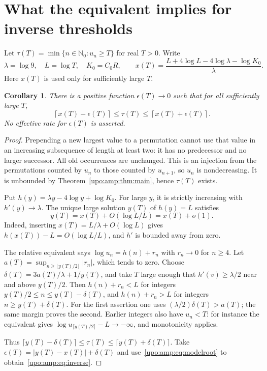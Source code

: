 \documentclass[11pt,letterpaper]{article}
\newtheorem{corollary}[theorem]{Corollary}
\theoremstyle{remark}\newtheorem{remark}[theorem]{Remark}
\numberwithin{equation}{section}
\newcommand{\N}{\mathbb N_0}
\begin{document}
\section{What the equivalent implies for inverse thresholds}\label{upo:amp:sec:inverse}
Let $\tau(T)=\min\{n\in\N:u_n\ge T\}$ for real $T>0$. Write
\[
\lambda=\log9,\quad L=\log T,\quad K_0=C_0R,
\qquad
x(T)=\frac{L+4\log L-4\log\lambda-\log K_0}{\lambda}.
\]
Here $x(T)$ is used only for sufficiently large $T$.

\begin{corollary}\label{upo:amp:cor:inverse}
There is a positive function $\epsilon(T)\to0$ such that for all
sufficiently large $T$,
\begin{equation}\label{upo:amp:eq:inverse}
\left\lceil x(T)-\epsilon(T)\right\rceil
\le\tau(T)\le
\left\lceil x(T)+\epsilon(T)\right\rceil.
\end{equation}
No effective rate for $\epsilon(T)$ is asserted.
\end{corollary}
\begin{proof}
Prepending a new largest value to a permutation cannot use that value in
an increasing subsequence of length at least two: it has no predecessor
and no larger successor. All old occurrences are unchanged. This is an
injection from the permutations counted by $u_n$ to those counted by
$u_{n+1}$, so $u_n$ is nondecreasing. It is unbounded by
Theorem~\ref{upo:amp:thm:main}, hence $\tau(T)$ exists.

Put $h(y)=\lambda y-4\log y+\log K_0$. For large $y$, it is strictly
increasing with $h'(y)\to\lambda$. The unique large solution $y(T)$ of
$h(y)=L$ satisfies
\begin{equation}\label{upo:amp:eq:modelroot}
y(T)=x(T)+O(\log L/L)=x(T)+o(1).
\end{equation}
Indeed, inserting $x(T)=L/\lambda+O(\log L)$ gives
$h(x(T))-L=O(\log L/L)$, and $h'$ is bounded away from zero.

The relative equivalent says
$\log u_n=h(n)+r_n$ with $r_n\to0$ for $n\ge4$.
Let $a(T)=\sup_{n\ge\lfloor y(T)/2\rfloor}|r_n|$, which tends to zero.
Choose $\delta(T)=3a(T)/\lambda+1/y(T)$, and take $T$ large enough
that $h'(v)\ge\lambda/2$ near and above $y(T)/2$.
Then $h(n)+r_n<L$ for integers $y(T)/2\le n\le y(T)-\delta(T)$,
and $h(n)+r_n>L$ for integers $n\ge y(T)+\delta(T)$.
For the first assertion one uses
$(\lambda/2)\delta(T)>a(T)$; the same margin proves the second.
Earlier integers also have $u_n<T$: for instance the equivalent gives
$\log u_{\lceil y(T)/2\rceil}-L\to-\infty$, and monotonicity applies.

Thus
$\lceil y(T)-\delta(T)\rceil\le\tau(T)
\le\lceil y(T)+\delta(T)\rceil$.
Take $\epsilon(T)=|y(T)-x(T)|+\delta(T)$ and
use~\eqref{upo:amp:eq:modelroot} to obtain~\eqref{upo:amp:eq:inverse}.
\end{proof}
\end{document}
